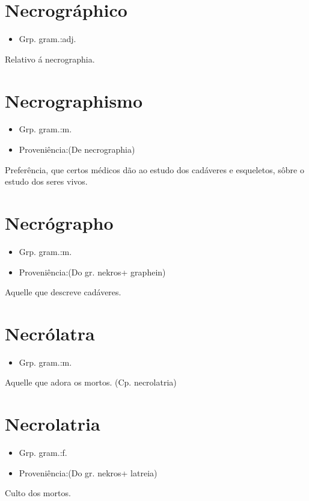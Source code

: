 \section{Necrográphico}
\begin{itemize}
\item {Grp. gram.:adj.}
\end{itemize}
Relativo á necrographia.
\section{Necrographismo}
\begin{itemize}
\item {Grp. gram.:m.}
\end{itemize}
\begin{itemize}
\item {Proveniência:(De \textunderscore necrographia\textunderscore )}
\end{itemize}
Preferência, que certos médicos dão ao estudo dos cadáveres e esqueletos, sôbre o estudo dos seres vivos.
\section{Necrógrapho}
\begin{itemize}
\item {Grp. gram.:m.}
\end{itemize}
\begin{itemize}
\item {Proveniência:(Do gr. \textunderscore nekros\textunderscore  + \textunderscore graphein\textunderscore )}
\end{itemize}
Aquelle que descreve cadáveres.
\section{Necrólatra}
\begin{itemize}
\item {Grp. gram.:m.}
\end{itemize}
Aquelle que adora os mortos.
(Cp. \textunderscore necrolatria\textunderscore )
\section{Necrolatria}
\begin{itemize}
\item {Grp. gram.:f.}
\end{itemize}
\begin{itemize}
\item {Proveniência:(Do gr. \textunderscore nekros\textunderscore  + \textunderscore latreia\textunderscore )}
\end{itemize}
Culto dos mortos.
